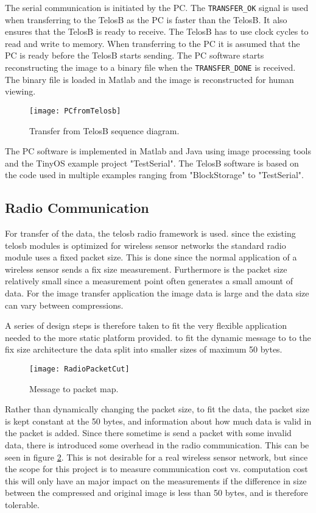 The serial communication is initiated by the PC. 
The \texttt{TRANSFER\_OK} signal is used when transferring to the TelosB as the PC is faster than the TelosB. 
It also ensures that the TelosB is ready to receive. 
The TelosB has to use clock cycles to read and write to memory. 
When transferring to the PC it is assumed that the PC is ready before the TelosB starts sending. 
The PC software starts reconstructing the image to a binary file when the \texttt{TRANSFER\_DONE} is received. 
The binary file is loaded in Matlab and the image is reconstructed for human viewing.
\begin{figure}[H]
	\centering
	\texttt{[image: PCfromTelosb]}
	\caption{Transfer from TelosB sequence diagram.}
	\label{transferfromtelos}
\end{figure}
The PC software is implemented in Matlab and Java using image processing tools and the TinyOS example project "TestSerial". 
The TelosB software is based on the code used in multiple examples ranging from "BlockStorage" to "TestSerial". 


\subsection{Radio Communication}\label{sec:Radio-Block}

For transfer of the data, the telosb radio framework is used. since the existing telosb modules is optimized for wireless sensor networks the standard radio module uses a fixed packet size. This is done since the normal application of a wireless sensor sends a fix size measurement. Furthermore is the packet size relatively small since a measurement point often generates a small amount of data. For the image transfer application the image data is large and the data size can vary between compressions.

A series of design steps is therefore taken to fit the very flexible application needed to the more static platform provided. to fit the dynamic message to to the fix size architecture the data split into smaller sizes of maximum 50 bytes. 

\begin{figure}[H]
	\centering
	\texttt{[image: RadioPacketCut]}
	\caption{Message to packet map.}
	\label{fig:RadioPacketCut}
\end{figure}

Rather than dynamically changing the packet size, to fit the data, the packet size is kept constant at the 50 bytes, and information about how much data is valid in the packet is added. 
Since there sometime is send a packet with some invalid data, there is introduced some overhead in the radio communication. 
This can be seen in figure \ref{fig:RadioPacketCut}. 
This is not desirable for a real wireless sensor network, but since the scope for this project is to measure communication cost vs. computation cost this will only have an major impact on the measurements if the difference in size between the compressed and original image is less than 50 bytes, and is therefore tolerable.

